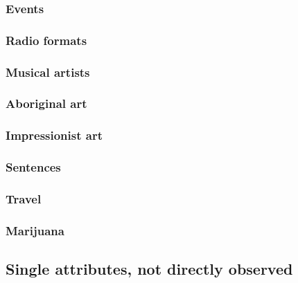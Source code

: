 \documentclass[11pt,letter]{article}
\begin{document}
\subsubsection{Events}



\subsubsection{Radio formats}



\subsubsection{Musical artists}



\subsubsection{Aboriginal art}



\subsubsection{Impressionist art}



\subsubsection{Sentences}



\subsubsection{Travel}



\subsubsection{Marijuana}



\subsection{Single attributes, not directly observed}
\end{document}
